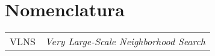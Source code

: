 
\chapter*{Nomenclatura}


\begin{tabular*}{20cm}{lp{12cm}}
VLNS & \textit{Very Large-Scale Neighborhood Search} \\
\end{tabular*}


